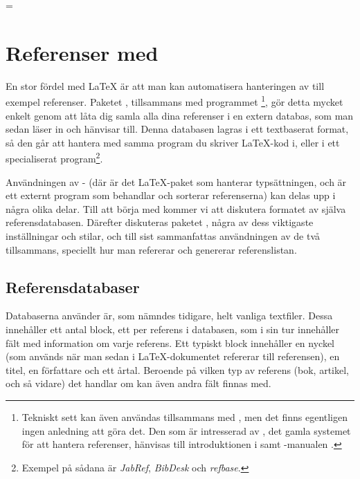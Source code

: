 \documentclass[10pt,../../a4.tex]{subfiles}
\begin{document}
\chardef\previousmode=\interactionmode
\nonstopmode
%
\chapter{Referenser med }\label{sec:5}
En stor fördel med \LaTeX{} är att man kan automatisera hanteringen av
till exempel referenser. Paketet , tillsammans med
programmet \footnote{Tekniskt sett kan även
\BibTeX{} användas tillsammans med , men det finns egentligen ingen anledning att göra det. Den som är intresserad av
\BibTeX{}, det gamla systemet för att hantera referenser, hänvisas till introduktionen i \textcite{Fenn06} samt \BibTeX{}-manualen
\parencite{Patashnik88a}.}, gör detta mycket enkelt genom att låta dig
samla alla dina referenser i en extern databas, som man sedan läser in
och hänvisar till. Denna databasen lagras i ett textbaserat format, så
den går att hantera med samma program du skriver \LaTeX-kod i, eller i
ett specialiserat program\footnote{Exempel på sådana är \emph{JabRef},
\emph{BibDesk} och \emph{refbase}.}.

Användningen av - (där  är det
\LaTeX-paket som hanterar typsättningen, och  är ett externt
program som behandlar och sorterar referenserna) kan delas upp i några
olika delar. Till att börja med kommer vi att diskutera formatet av
själva referensdatabasen. Därefter diskuteras paketet ,
några av dess viktigaste inställningar och stilar, och till sist
sammanfattas användningen av de två tillsammans, speciellt hur man
refererar och genererar referenslistan.

\section{Referensdatabaser}
Databaserna  använder är, som nämndes tidigare, helt
vanliga textfiler. Dessa innehåller ett antal block, ett per referens
i databasen, som i sin tur innehåller fält med information om varje
referens. Ett typiskt block innehåller en nyckel (som används när man
sedan i \LaTeX-dokumentet refererar till referensen), en titel, en
författare och ett årtal. Beroende på vilken typ av referens (bok,
artikel, och så vidare) det handlar om kan även andra fält finnas med.
\end{document}
